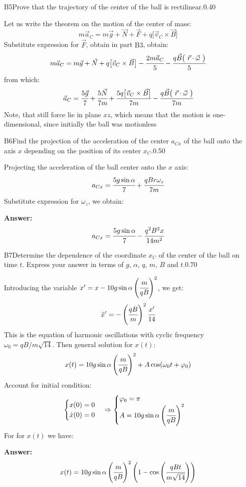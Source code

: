 \documentclass[11pt,a4paper]{article}
\begin{document}
\begin{solcard}{B5}{Prove that the trajectory of the center of the ball is rectilinear.}{0.40}

Let us write the theorem on the motion of the center of mass: $$m\vec{a}_C=m\vec{g}+\vec{N}+\vec{F}+q\bigl[\vec{v}_C\times\vec{B}\bigr] $$Substitute expression for $\vec{F}$, obtain in part $\mathrm{B3}$, obtain: $$m\vec{a}_C=m\vec{g}+\vec{N}+q\bigl[\vec{v}_C\times\vec{B}\bigr]-\cfrac{2m\vec{a}_C}{5}-\cfrac{q\vec{B}\bigl({~}\vec{r}\cdot\vec{\omega}{~}\bigr)}{5} $$from which: $$\vec{a}_C=\cfrac{5\vec{g}}{7}+\cfrac{5\vec{N}}{7m}+\cfrac{5q\bigl[\vec{v}_C\times\vec{B}\bigr]}{7m}-\cfrac{q\vec{B}\bigl({~}\vec{r}\cdot\vec{\omega}{~}\bigr)}{7m} $$Note, that still force lie in plane $xz$, which means that the motion is one-dimensional, since initially the ball was motionless

\end{solcard}

\begin{solcard}{B6}{Find the projection of the acceleration of the center $a_{Cx}$ of the ball onto the axis $x$ depending on the position of its center $x_C$.}{0.50}

Projecting the acceleration of the ball center onto the $x$ axis: $$a_{Cx}=\cfrac{5g\sin\alpha}{7}+\cfrac{qBr\omega_z}{7m} $$Substitute expression for $\omega_z$, we obtain:

\par\smallskip\noindent\textbf{Answer:} $$a_{Cx}=\cfrac{5g\sin\alpha}{7}-\cfrac{q^2B^2x}{14m^2} $$
\end{solcard}

\begin{solcard}{B7}{Determine the dependence of the coordinate $x_C$ of the center of the ball on time $t$. Express your answer in terms of $g$, $\alpha$, $q$, $m$, $B$ and $t$.}{0.70}

Introducing the variable $x'=x-10g\sin\alpha\left(\cfrac{m}{qB}\right)^2$, we get: $$\ddot{x}'=-\left(\cfrac{qB}{m}\right)^2\cfrac{x'}{14} $$This is the equation of harmonic oscillations with cyclic frequency $\omega_0=qB/m\sqrt{14}$. Then general solution for $x(t)$: $$x(t)=10g\sin\alpha\left(\cfrac{m}{qB}\right)^2+A\cos(\omega_0t+\varphi_0) $$Account for initial condition: $$ \begin{cases} x(0)=0\\ \dot{x}(0)=0 \end{cases} \Rightarrow \begin{cases} \varphi_0=\pi\\ A=10g\sin\alpha\left(\cfrac{m}{qB}\right)^2 \end{cases} $$For for $x(t)$ we have:

\par\smallskip\noindent\textbf{Answer:} $$x(t)=10g\sin\alpha\left(\cfrac{m}{qB}\right)^2\left(1-\cos\left(\cfrac{qBt}{m\sqrt{14}}\right)\right) $$
\end{solcard}
\end{document}
